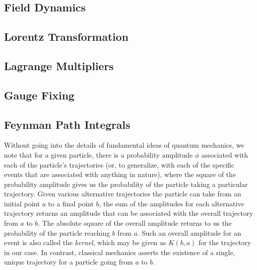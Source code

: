 \documentclass{emulateapj}
\begin{document}
\subsection{Field Dynamics} \label{field}

\subsection{Lorentz Transformation} \label{lorentz}

\subsection{Lagrange Multipliers} \label{multpliers}

\subsection{Gauge Fixing} \label{gauge}

\subsection{Feynman Path Integrals} \label{feynman}
Without going into the details of fundamental ideas of quantum mechanics, we note that for a given particle, there is a probability amplitude $\phi$ associated with each of the particle's trajectories (or, to generalize, with each of the specific events that are associated with anything in nature), where the square of the probability amplitude gives us the probability of the particle taking a particular trajectory. Given various alternative trajectories the particle can take from an initial point $a$ to a final point $b$, the sum of the amplitudes for each alternative trajectory returns an amplitude that can be associated with the overall trajectory from $a$ to $b$. The absolute square of the overall amplitude returns to us the probability of the particle reaching $b$ from $a$. Such an overall amplitude for an event is also called the \textit{kernel}, which may be given as $K(b,a)$ for the trajectory in our case. In contrast, classical mechanics asserts the existence of a single, unique trajectory for a particle going from $a$ to $b$. 
\end{document}
